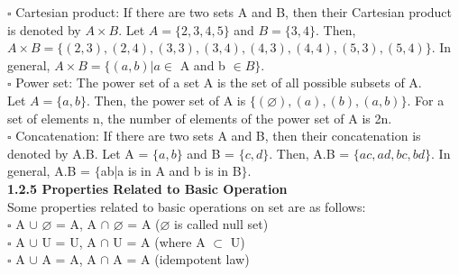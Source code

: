 \documentclass[12pt,a4paper]{book}
\begin{document}
\begin{center}

\end{center}
$\square$ Cartesian product: If there are two sets A and B, then their Cartesian
product is denoted by $A \times B$. Let $A = \{2, 3, 4, 5\}$ and $B = \{3, 4\}$. Then,
$A \times B = \{(2, 3), (2, 4), (3, 3), (3, 4),(4, 3), (4, 4), (5, 3), (5, 4)\}$. In general,
$A \times B = \{(a, b)|a \in$ A and b $\in B\}$.\\
$\square$ Power set: The power set of a set A is the set of all possible subsets of A.\\
Let $A = \{a, b\}$. Then, the power set of A is $\{(\varnothing), (a), (b), (a, b)\}$. For a set
of elements n, the number of elements of the power set of A is 2n.\\
$\square$ Concatenation: If there are two sets A and B, then their concatenation is
denoted by A.B. Let A = $\{a, b\}$ and B = $\{c, d\}$. Then, A.B = $\{ac, ad, bc,bd\}$. In general, A.B = $\{$ab|a is in A and b is in B$\}$.\\
\textbf{1.2.5 Properties Related to Basic Operation} \\
Some properties related to basic operations on set are as follows:\\
$\square$ A $\cup$ $\varnothing$ = A, A $\cap$ $\varnothing$ = A ($\varnothing$ is called null set)\\
$\square$ A $\cup$ U = U, A $\cap$ U = A (where A $\subset$ U)\\
$\square$ A $\cup$ A = A, A $\cap$ A = A (idempotent law)\\
\end{document}
